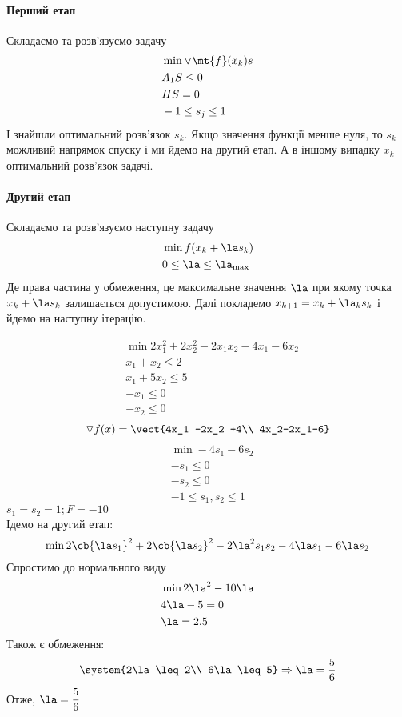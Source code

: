\paragraph{Перший етап} Складаємо та розв’язуємо задачу 
\begin{eqnarray}
&\min \triangledown \mt{f} (x_k) s \\
&A_1 S \leq 0 \\
&H S = 0 \\
&-1 \leq s_j \leq 1
\end{eqnarray}
І знайшли оптимальний розв’язок $s_k$. Якщо значення функції менше нуля, то $s_k$ можливий напрямок спуску і ми йдемо на другий етап. А в іншому випадку $x_k$ оптимальний розв’язок задачі.
\paragraph{Другий етап} Складаємо та розв’язуємо наступну задачу 
\begin{eqnarray}
&\min f(x_k+\la s_k)\\
&0\leq \la \leq \la_{\max}
\end{eqnarray}
Де права частина у обмеження, це максимальне значення $\la$ при якому точка $x_k+\la s_k$ залишається допустимою. Далі покладемо $x_{k+1} = x_k+\la_k s_k$ і йдемо на наступну ітерацію.
\begin{exs}
\begin{eqnarray}
&\min 2x_1^2 + 2x_2^2 - 2x_1x_2 -4x_1 -6 x_2\\
&x_1+x_2 \leq 2\\
&x_1 +5x_2\leq 5\\
&-x_1 \leq 0\\
&-x_2 \leq 0
\end{eqnarray}
\begin{equation}
\triangledown f(x) = \vect{4x_1 -2x_2 +4\\ 4x_2-2x_1-6}
\end{equation}
\begin{eqnarray}
&\min -4s_1 - 6s_2 \\
&-s_1\leq 0\\
&-s_2 \leq 0\\
&-1\leq s_1,s_2 \leq 1
\end{eqnarray}
$s_1=s_2=1;F=-10$\\
Ідемо на другий етап:
\begin{equation}
\min 2\cb{\la s_1}^2 + 2\cb{\la s_2}^2 -2 \la^2 s_1 s_2 -4\la s_1 - 6 \la s_2 
\end{equation}
Спростимо до нормального виду
\begin{eqnarray}
&\min 2\la^2 -10\la \\
&4\la -5 = 0\\
&\la =2.5
\end{eqnarray}
Також є обмеження:
\begin{equation}
\system{2\la \leq 2\\ 6\la \leq 5} \Rightarrow \la = \dfrac56
\end{equation}
Отже, $\la=\dfrac56$
\end{exs}
